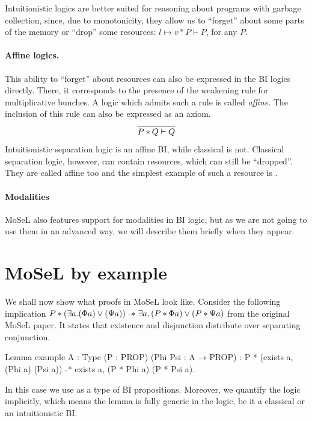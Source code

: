 Intuitionistic logics are better suited for reasoning about programs with garbage collection, since, due to monotonicity, they allow us to ``forget''  about some parts of the memory or ``drop'' some resources: \(l \mapsto v \ast P \vdash P\), for any \(P\).

\paragraph{Affine logics.}
This ability to ``forget'' about resources can also be expressed in the BI logics directly.
There, it corresponds to the presence of the weakening rule for multiplicative bunches.
A logic which admits such a rule is called \emph{affine}.
The inclusion of this rule can also be expressed as an axiom.
\[\infer{P \ast Q\vdash Q}{}\]
Intuitionistic separation logic is an affine BI, while classical is not.
Classical separation logic, however, can contain resources, which can still be ``dropped''.
They are called affine too and the simplest example of such a resource is \emp.

\paragraph{Modalities}
MoSeL also features support for modalities in BI logic, but as we are not going to use them in an advanced way, we will describe them briefly when they appear.

\section{MoSeL by example}
\label{sec:mosel-example}

We shall now show what proofs in MoSeL look like.
Consider the following implication
\(P \ast (\exists a. (\Phi a) \vee (\Psi a)) \mathrel{-\mkern-6mu*} \exists a, (P \ast \Phi a) \vee (P \ast \Psi a)\) from the original MoSeL paper\cite{krebbersMoSeLGeneralExtensible2018}.
It states that existence and disjunction distribute over separating conjunction.

\begin{coq}
Lemma example {A : Type} (P : PROP) (Phi Psi : A → PROP) :
  P * (exists a, (Phi a) \/ (Psi a)) -* exists a, (P * Phi a) \/ (P * Psi a).
\end{coq}

In this case we use  as a type of BI propositions.
Moreover, we quantify the logic implicitly, which means the lemma is fully generic in the logic, be it a classical or an intuitionistic BI.

